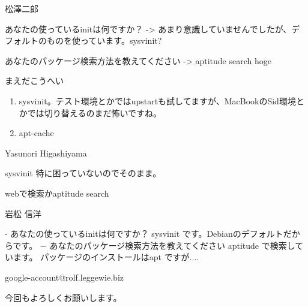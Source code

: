 \begin{prework}{ 松澤二郎 }

あなたの使っているinitは何ですか？
-> あまり意識していませんでしたが、デフォルトのものを使っています。sysvinit?

あなたのパッケージ検索方法を教えてください
-> aptitude search hoge


\end{prework}



\begin{prework}{ まえだこうへい }

\begin{enumerate}
\item sysvinit。テスト環境とかではupstartも試してますが、MacBookのSid環境とかでは切り替えるのまだ怖いですね。
\item apt-cache
\end{enumerate}

\end{prework}



\begin{prework}{ Yasunori Higashiyama }

sysvinit
特に困っていないのでそのまま。


webで検索かaptitude search

\end{prework}



\begin{prework}{ 岩松 信洋 }

- あなたの使っているinitは何ですか？
sysvinit です。Debianのデフォルトだからです。
− あなたのパッケージ検索方法を教えてください
aptitude で検索しています。
パッケージのインストールはapt ですが....

\end{prework}



\begin{prework}{ google-account@rolf.leggewie.biz }

今回もよろしくお願いします。

\end{prework}


